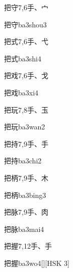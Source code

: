 \begin{entry}{把守}{7,6}{⼿、⼧}
  \begin{phonetics}{把守}{ba3shou3}
  \end{phonetics}
\end{entry}

\begin{entry}{把式}{7,6}{⼿、⼷}
  \begin{phonetics}{把式}{ba3shi4}
  \end{phonetics}
\end{entry}

\begin{entry}{把戏}{7,6}{⼿、⼽}
  \begin{phonetics}{把戏}{ba3xi4}
  \end{phonetics}
\end{entry}

\begin{entry}{把玩}{7,8}{⼿、⽟}
  \begin{phonetics}{把玩}{ba3wan2}
  \end{phonetics}
\end{entry}

\begin{entry}{把持}{7,9}{⼿、⼿}
  \begin{phonetics}{把持}{ba3chi2}
  \end{phonetics}
\end{entry}

\begin{entry}{把柄}{7,9}{⼿、⽊}
  \begin{phonetics}{把柄}{ba3bing3}
  \end{phonetics}
\end{entry}

\begin{entry}{把脉}{7,9}{⼿、⾁}
  \begin{phonetics}{把脉}{ba3mai4}
  \end{phonetics}
\end{entry}

\begin{entry}{把握}{7,12}{⼿、⼿}
  \begin{phonetics}{把握}{ba3wo4}[][HSK 3]
  \end{phonetics}
\end{entry}

